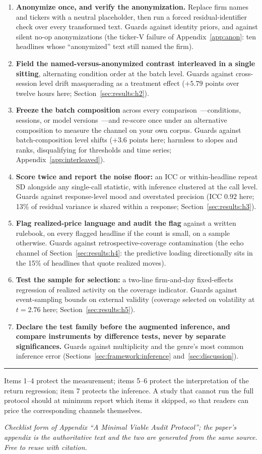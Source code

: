 \documentclass[10pt,a4paper]{article}
\begin{document}
\vspace{2pt}
\begin{enumerate}[leftmargin=1.4em, itemsep=4pt, topsep=2pt]
\item \textbf{Anonymize once, and verify the anonymization.} Replace firm names and tickers with a neutral placeholder, then run a forced residual-identifier check over every transformed text. Guards against identity priors, and against silent no-op anonymizations (the ticker-V failure of Appendix~\ref{app:anon}: ten headlines whose ``anonymized'' text still named the firm).
\item \textbf{Field the named-versus-anonymized contrast interleaved in a single sitting}, alternating condition order at the batch level. Guards against cross-session level drift masquerading as a treatment effect ($+5.79$ points over twelve hours here; Section~\ref{sec:results:h2}).
\item \textbf{Freeze the batch composition} across every comparison~---conditions, sessions, or model versions~---and re-score once under an alternative composition to measure the channel on your own corpus. Guards against batch-composition level shifts ($+3.6$ points here; harmless to slopes and ranks, disqualifying for thresholds and time series; Appendix~\ref{app:interleaved}).
\item \textbf{Score twice and report the noise floor:} an ICC or within-headline repeat SD alongside any single-call statistic, with inference clustered at the call level. Guards against response-level mood and overstated precision (ICC $0.92$ here; 13\% of residual variance is shared within a response; Section~\ref{sec:results:h3}).
\item \textbf{Flag realized-price language and audit the flag} against a written rulebook, on every flagged headline if the count is small, on a sample otherwise. Guards against retrospective-coverage contamination (the echo channel of Section~\ref{sec:results:h4}: the predictive loading directionally sits in the 15\% of headlines that quote realized moves).
\item \textbf{Test the sample for selection:} a two-line firm-and-day fixed-effects regression of realized activity on the coverage indicator. Guards against event-sampling bounds on external validity (coverage selected on volatility at $t=2.76$ here; Section~\ref{sec:results:h5}).
\item \textbf{Declare the test family before the augmented inference, and compare instruments by difference tests, never by separate significances.} Guards against multiplicity and the genre's most common inference error (Sections~\ref{sec:framework:inference} and~\ref{sec:discussion}).
\end{enumerate}
\vspace{2pt}
\rule{\textwidth}{0.4pt}
\vspace{1pt}
Items 1--4 protect the measurement; items 5--6 protect the interpretation of the return regression; item 7 protects the inference. A study that cannot run the full protocol should at minimum report which items it skipped, so that readers can price the corresponding channels themselves.

\vspace{4pt}
{\footnotesize\emph{Checklist form of Appendix ``A Minimal Viable Audit Protocol''; the paper's appendix is
the authoritative text and the two are generated from the same source. Free to reuse with citation.}}
\end{document}
